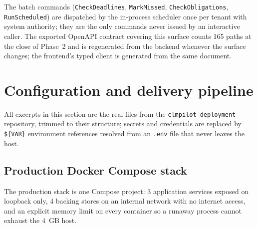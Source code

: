 The batch commands (\texttt{CheckDeadlines}, \texttt{MarkMissed},
\texttt{CheckObligations}, \texttt{RunScheduled}) are dispatched by the
in-process scheduler once per tenant with system authority; they are the
only commands never issued by an interactive caller. The exported
OpenAPI contract covering this surface counts 165 paths at the close of
Phase~2 and is regenerated from the backend whenever the surface
changes; the frontend's typed client is generated from the same
document.

\section{Configuration and delivery pipeline}
\label{sec:app-config}

All excerpts in this section are the real files from the
\texttt{clmpilot-deployment} repository, trimmed to their structure;
secrets and credentials are replaced by \texttt{\$\{VAR\}} environment
references resolved from an \texttt{.env} file that never leaves the
host.

\subsection{Production Docker Compose stack}

The production stack is one Compose project: 3 application services
exposed on loopback only, 4 backing stores on an internal network with
no internet access, and an explicit memory limit on every container so
a runaway process cannot exhaust the 4~GB host.

